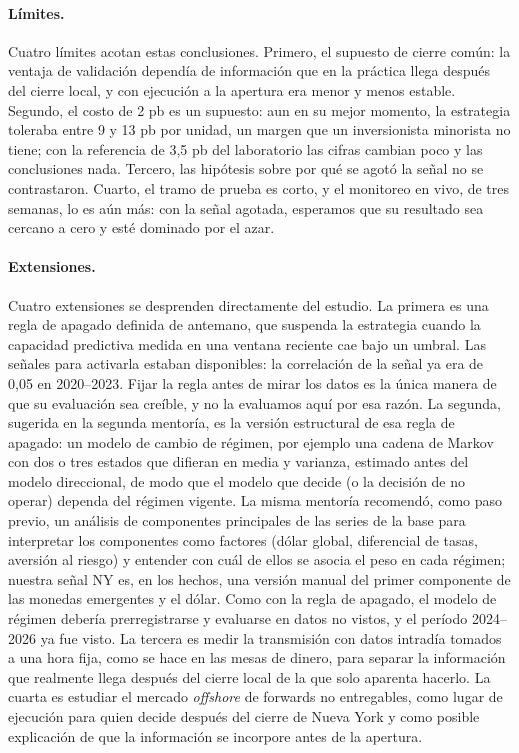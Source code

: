 \documentclass[11pt,a4paper]{article}
\begin{document}
\paragraph{Límites.} Cuatro límites acotan estas conclusiones. Primero, el supuesto de cierre común: la ventaja de validación dependía de información que en la práctica llega después del cierre local, y con ejecución a la apertura era menor y menos estable. Segundo, el costo de 2 pb es un supuesto: aun en su mejor momento, la estrategia toleraba entre 9 y 13 pb por unidad, un margen que un inversionista minorista no tiene; con la referencia de 3,5 pb del laboratorio las cifras cambian poco y las conclusiones nada. Tercero, las hipótesis sobre por qué se agotó la señal no se contrastaron. Cuarto, el tramo de prueba es corto, y el monitoreo en vivo, de tres semanas, lo es aún más: con la señal agotada, esperamos que su resultado sea cercano a cero y esté dominado por el azar.

\paragraph{Extensiones.} Cuatro extensiones se desprenden directamente del estudio. La primera es una regla de apagado definida de antemano, que suspenda la estrategia cuando la capacidad predictiva medida en una ventana reciente cae bajo un umbral. Las señales para activarla estaban disponibles: la correlación de la señal ya era de 0,05 en 2020--2023. Fijar la regla antes de mirar los datos es la única manera de que su evaluación sea creíble, y no la evaluamos aquí por esa razón. La segunda, sugerida en la segunda mentoría, es la versión estructural de esa regla de apagado: un modelo de cambio de régimen, por ejemplo una cadena de Markov con dos o tres estados que difieran en media y varianza, estimado antes del modelo direccional, de modo que el modelo que decide (o la decisión de no operar) dependa del régimen vigente. La misma mentoría recomendó, como paso previo, un análisis de componentes principales de las series de la base para interpretar los componentes como factores (dólar global, diferencial de tasas, aversión al riesgo) y entender con cuál de ellos se asocia el peso en cada régimen; nuestra señal NY es, en los hechos, una versión manual del primer componente de las monedas emergentes y el dólar. Como con la regla de apagado, el modelo de régimen debería prerregistrarse y evaluarse en datos no vistos, y el período 2024--2026 ya fue visto. La tercera es medir la transmisión con datos intradía tomados a una hora fija, como se hace en las mesas de dinero, para separar la información que realmente llega después del cierre local de la que solo aparenta hacerlo. La cuarta es estudiar el mercado \emph{offshore} de forwards no entregables, como lugar de ejecución para quien decide después del cierre de Nueva York y como posible explicación de que la información se incorpore antes de la apertura.
\end{document}
